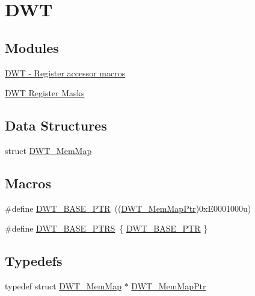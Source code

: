 \hypertarget{group___d_w_t___peripheral}{}\section{D\+W\+T}
\label{group___d_w_t___peripheral}
\subsection*{Modules}
\begin{DoxyCompactItemize}
\item 
\hyperlink{group___d_w_t___register___accessor___macros}{D\+W\+T -\/ Register accessor macros}
\item 
\hyperlink{group___d_w_t___register___masks}{D\+W\+T Register Masks}
\end{DoxyCompactItemize}
\subsection*{Data Structures}
\begin{DoxyCompactItemize}
\item 
struct \hyperlink{struct_d_w_t___mem_map}{D\+W\+T\+\_\+\+Mem\+Map}
\end{DoxyCompactItemize}
\subsection*{Macros}
\begin{DoxyCompactItemize}
\item 
\#define \hyperlink{group___d_w_t___peripheral_ga3b46dfb2ea7946c6938028d879c82cb1}{D\+W\+T\+\_\+\+B\+A\+S\+E\+\_\+\+P\+T\+R}~((\hyperlink{group___d_w_t___peripheral_ga8a09a1b28d871c18ae8c69f67af6d573}{D\+W\+T\+\_\+\+Mem\+Map\+Ptr})0x\+E0001000u)
\item 
\#define \hyperlink{group___d_w_t___peripheral_ga606d55285f2df3c4bb43272ec842b475}{D\+W\+T\+\_\+\+B\+A\+S\+E\+\_\+\+P\+T\+R\+S}~\{ \hyperlink{group___d_w_t___peripheral_ga3b46dfb2ea7946c6938028d879c82cb1}{D\+W\+T\+\_\+\+B\+A\+S\+E\+\_\+\+P\+T\+R} \}
\end{DoxyCompactItemize}
\subsection*{Typedefs}
\begin{DoxyCompactItemize}
\item 
typedef struct \hyperlink{struct_d_w_t___mem_map}{D\+W\+T\+\_\+\+Mem\+Map} $\ast$ \hyperlink{group___d_w_t___peripheral_ga8a09a1b28d871c18ae8c69f67af6d573}{D\+W\+T\+\_\+\+Mem\+Map\+Ptr}
\end{DoxyCompactItemize}


